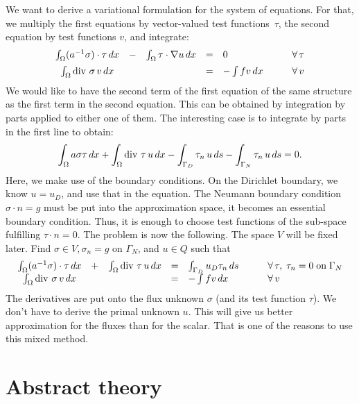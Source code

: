 We want to derive a variational formulation for the system of equations.
For that, we multiply the first equations by vector-valued test functions~$\tau$, the second equation by test functions $v$, and integrate:
$$
\begin{array}{ccccll}
\int_\Omega (a^{-1} \sigma) \cdot \tau \, dx & - & \int_\Omega \tau \cdot \nabla u \, dx & = & 0 \qquad & \forall \, \tau \\[0.5em]
\int_\Omega \operatorname{div} \, \sigma \, v \, dx & & & = & - \int f v \, dx \qquad & \forall \, v
\end{array}
$$
We would like to have the second term of the first equation of the same
structure as the first term in the second equation. This can be obtained
by integration by parts applied to either one of them. The interesting
case is to integrate by parts in the first line to obtain:
$$
\int_\Omega a \sigma \tau \, dx + \int_\Omega \operatorname{div} \, \tau \, u \, dx
-\int_{\Gamma_D} \tau_n \, u \, ds - \int_{\Gamma_N} \tau_n \, u \, ds = 0.
$$
Here, we make use of the boundary conditions. On the Dirichlet boundary,
we know $u = u_D$, and use that in the equation. The Neumann boundary
condition $\sigma \cdot n = g$ must be put into the approximation space,
it becomes an essential boundary condition. Thus, it is enough to choose
test functions of the sub-space fulfilling $\tau \cdot n = 0$.
The problem is now the following. The space $V$ will be fixed later.
Find $\sigma \in V, \sigma_n = g$ on $\Gamma_N$, and $u \in Q$
such that
$$
\begin{array}{ccccll}
\int_\Omega (a^{-1} \sigma) \cdot \tau \, dx & + & 
\int_\Omega \operatorname{div} \, \tau  \, u \, dx & = & \int_{\Gamma_D} u_D \tau _n \, ds \qquad & \forall \, \tau, \; \tau_n = 0 \; \mbox{on} \; \Gamma_N \\
\int_\Omega \operatorname{div} \, \sigma \, v \, dx & & & = & - \int f v \, dx \qquad & \forall \, v
\end{array}
$$
The derivatives are put onto the flux unknown $\sigma$ (and its test function $\tau$).
We don't have to derive the primal unknown $u$. This will give us better
approximation for the fluxes than for the scalar. That is one of the reasons
to use this mixed method.


\section{Abstract theory}


